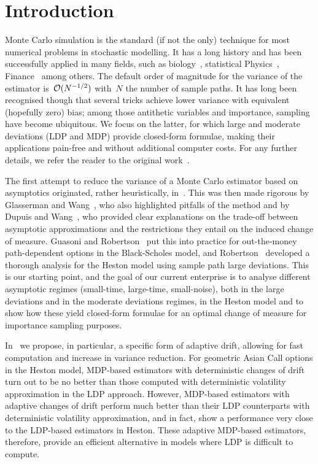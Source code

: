 \section{Introduction}

Monte Carlo simulation is the standard (if not the only) technique for most numerical problems in stochastic modelling.
It has a long history and has been successfully applied in many fields, such as biology~\cite{Manly2018RandomizationBiology}, statistical Physics~\cite{Binder2012MontePhysics}, Finance~\cite{Glasserman1997CounterexamplesProbabilities} among others.
The default order of magnitude for the variance of the estimator is~$\mathcal{O}(N^{-1/2})$ with~$N$ the number of sample paths.
It has long been recognised though that several tricks achieve lower variance with equivalent (hopefully zero) bias; among those antithetic variables and importance, sampling have become ubiquitous.
We focus on the latter, for which large and moderate deviations (LDP and MDP) provide closed-form formulae, 
making their applications pain-free and without additional computer costs. For any further details, we refer the reader to the original work~\cite{Geha2023LargeModel}.

The first attempt to reduce the variance of a Monte Carlo estimator based on asymptotics originated, rather heuristically, in~\cite{Siegmund1976ImportanceTests}. 
This was then made rigorous by Glasserman and Wang~\cite{Glasserman1997CounterexamplesProbabilities}, who also highlighted pitfalls of the method and by Dupuis and Wang~\cite{Dupuis2004ImportanceGames}, who provided clear explanations on the trade-off between asymptotic approximations and the restrictions they entail on the induced change of measure.
Guasoni and Robertson~\cite{Guasoni2007OptimalTime} 
put this into practice for out-the-money path-dependent options in the Black-Scholes model,
and Robertson~\cite{Robertson2010SampleModels} developed a thorough analysis for the Heston model using sample path large deviations.
This is our starting point,
and the goal of our current enterprise is to analyse different asymptotic regimes 
(small-time, large-time, small-noise),
both in the large deviations and in the moderate deviations regimes, in the Heston model 
and to show how these yield closed-form formulae for an optimal change of measure for importance sampling purposes.

In~\cite{Geha2023LargeModel} we propose, in particular, a specific form of adaptive drift, allowing for fast computation
and increase in variance reduction.
For geometric Asian Call options in the Heston model, MDP-based estimators with deterministic changes of drift turn out to be no better than those computed with deterministic volatility approximation in the LDP approach. 
However, MDP-based estimators with adaptive changes of drift perform much better than their LDP counterparts with deterministic volatility approximation, 
and in fact, show a performance very close to the LDP-based estimators in Heston. 
These adaptive MDP-based estimators, therefore, provide an efficient alternative in models where 
LDP is difficult to compute.


